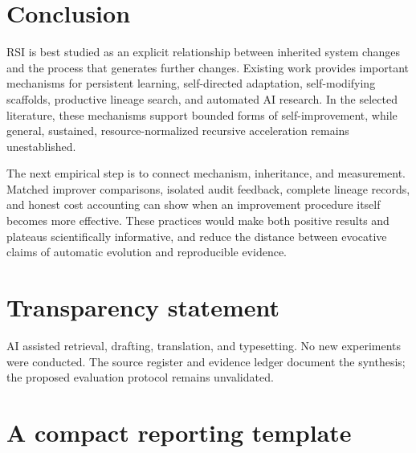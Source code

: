 \documentclass[11pt,american,]{article}
\begin{document}
\hypertarget{conclusion}{%
\section{Conclusion}\label{conclusion}}

RSI is best studied as an explicit relationship between inherited system
changes and the process that generates further changes. Existing work
provides important mechanisms for persistent learning, self-directed
adaptation, self-modifying scaffolds, productive lineage search, and
automated AI research. In the selected literature, these mechanisms
support bounded forms of self-improvement, while general, sustained,
resource-normalized recursive acceleration remains unestablished.

The next empirical step is to connect mechanism, inheritance, and
measurement. Matched improver comparisons, isolated audit feedback,
complete lineage records, and honest cost accounting can show when an
improvement procedure itself becomes more effective. These practices
would make both positive results and plateaus scientifically
informative, and reduce the distance between evocative claims of
automatic evolution and reproducible evidence.

\hypertarget{transparency-statement}{%
\section{Transparency statement}\label{transparency-statement}}

AI assisted retrieval, drafting, translation, and typesetting. No new
experiments were conducted. The source register and evidence ledger
document the synthesis; the proposed evaluation protocol remains
unvalidated.

\clearpage
\appendix

\hypertarget{a-compact-reporting-template}{%
\section{A compact reporting
template}\label{a-compact-reporting-template}}
\end{document}
